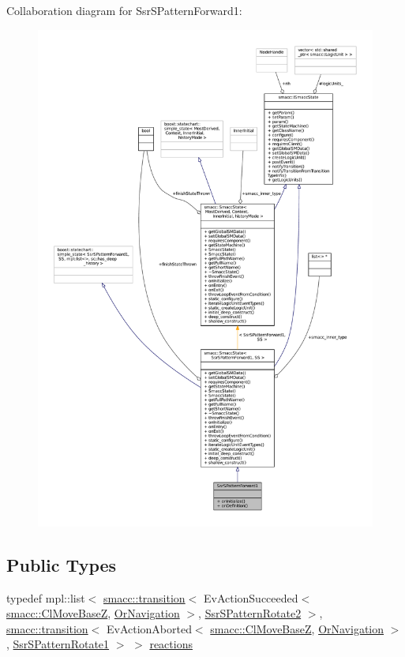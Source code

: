 Collaboration diagram for Ssr\+S\+Pattern\+Forward1\+:
\nopagebreak
\begin{figure}[H]
\begin{center}
\leavevmode
\includegraphics[width=350pt]{structSsrSPatternForward1__coll__graph}
\end{center}
\end{figure}
\subsection*{Public Types}
\begin{DoxyCompactItemize}
\item 
typedef mpl\+::list$<$ \hyperlink{classsmacc_1_1transition}{smacc\+::transition}$<$ Ev\+Action\+Succeeded$<$ \hyperlink{classsmacc_1_1ClMoveBaseZ}{smacc\+::\+Cl\+Move\+BaseZ}, \hyperlink{classOrNavigation}{Or\+Navigation} $>$, \hyperlink{structSsrSPatternRotate2}{Ssr\+S\+Pattern\+Rotate2} $>$, \hyperlink{classsmacc_1_1transition}{smacc\+::transition}$<$ Ev\+Action\+Aborted$<$ \hyperlink{classsmacc_1_1ClMoveBaseZ}{smacc\+::\+Cl\+Move\+BaseZ}, \hyperlink{classOrNavigation}{Or\+Navigation} $>$, \hyperlink{structSsrSPatternRotate1}{Ssr\+S\+Pattern\+Rotate1} $>$ $>$ \hyperlink{structSsrSPatternForward1_a78e21524356c8c071893bf7e41a98558}{reactions}
\end{DoxyCompactItemize}
